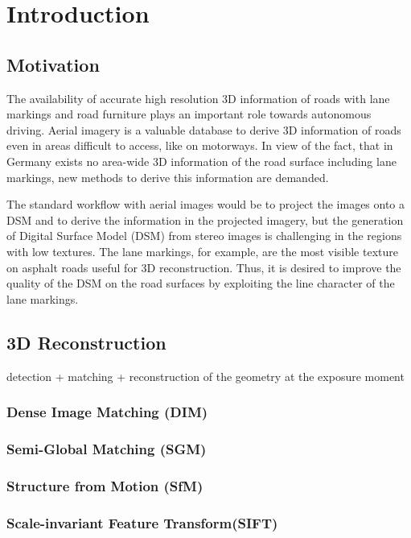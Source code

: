 
\chapter{Introduction}

\section{Motivation}
The availability of accurate high resolution 3D information of roads with lane markings and road furniture plays an important role towards autonomous driving. Aerial imagery is a valuable database to derive 3D information of roads even in areas difficult to access, like on motorways. In view of the fact, that in Germany exists no area-wide 3D information of the road surface including lane markings, new methods to derive this information are demanded.

The standard workflow with aerial images would be to project the images onto a DSM and to derive the information in the projected imagery, but the generation of Digital Surface Model (DSM) from stereo images is challenging in the regions with low textures. The lane markings, for example, are the most visible texture on asphalt roads useful for 3D reconstruction. Thus, it is desired to improve the quality of the DSM on the road surfaces by exploiting the line character of the lane markings. 

\section{3D Reconstruction}
detection + matching + reconstruction of the geometry at the exposure moment

\subsection{Dense Image Matching (DIM)}




\subsection{Semi-Global Matching (SGM)}

\subsection{Structure from Motion (SfM)}


\subsection{Scale-invariant Feature Transform(SIFT)}



